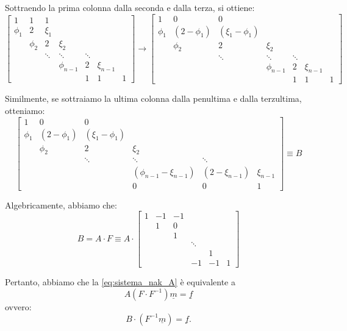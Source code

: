 Sottraendo la prima colonna dalla seconda e dalla terza, si ottiene:
\begin{equation*}
\begin{bmatrix}
1 & 1 & 1 & & & \\
\phi_1 & 2 & \xi_1 & & & \\
& \phi_2 & 2 & \xi_2 & & \\
& & \ddots & \ddots & \ddots & \\
& & & \phi_{n-1} & 2 & \xi_{n-1} \\
& & & & 1 & 1 & 1
\end{bmatrix}
\rightarrow
\begin{bmatrix}
1 & 0 & 0 & & & \\
\phi_1 & (2-\phi_1) & (\xi_1-\phi_1) & & & \\
& \phi_2 & 2 & \xi_2 & & \\
& & \ddots & \ddots & \ddots & \\
& & & \phi_{n-1} & 2 & \xi_{n-1} \\
& & & & 1 & 1 & 1
\end{bmatrix}
\end{equation*}

Similmente, se sottraiamo la ultima colonna dalla penultima e dalla terzultima, otteniamo:
\begin{equation*}
\begin{bmatrix}
1 & 0 & 0 & & & \\
\phi_1 & (2-\phi_1) & (\xi_1-\phi_1) & & & \\
& \phi_2 & 2 & \xi_2 & & \\
& & \ddots & \ddots & \ddots & \\
& & & (\phi_{n-1}-\xi_{n-1}) & (2-\xi_{n-1}) & \xi_{n-1} \\
& & & 0 & 0 & 1
\end{bmatrix}
\equiv B
\end{equation*}

Algebricamente, abbiamo che:
\begin{equation*}
B = A \cdot F \equiv A \cdot
\begin{bmatrix}
1 & -1 & -1 & & & \\
& 1 & 0 & & & \\
& & 1 & & & \\
& & & \ddots & & \\
& & & & 1 & \\
& & & -1 & -1 & 1
\end{bmatrix}
\end{equation*}

Pertanto, abbiamo che la \eqref{eq:sistema_nak_A} è equivalente a
\begin{equation*}
A(F \cdot F^{-1}) \underline{m} = \underline{f}
\end{equation*}
ovvero:
\begin{equation*}
B \cdot (F^{-1}\underline{m}) = \underline{f} .
\end{equation*}

